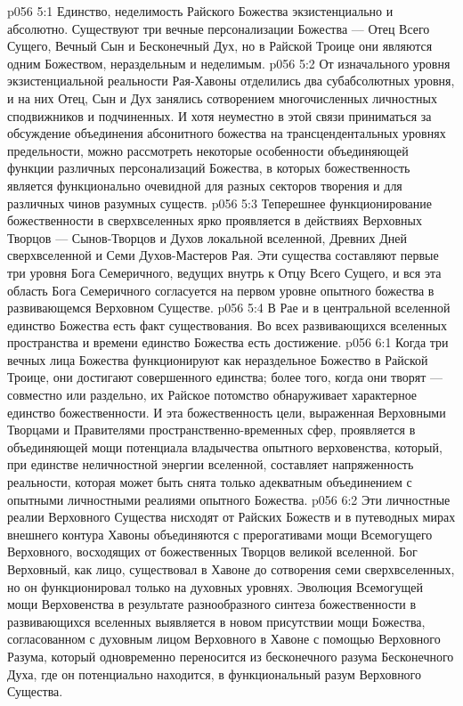 \vs p056 5:1 Единство, неделимость Райского Божества экзистенциально и абсолютно. Существуют три вечные персонализации Божества --- Отец Всего Сущего, Вечный Сын и Бесконечный Дух, но в Райской Троице они  являются одним Божеством, нераздельным и неделимым.
\vs p056 5:2 \pc От изначального уровня экзистенциальной реальности Рая\hyp{}Хавоны отделились два субабсолютных уровня, и на них Отец, Сын и Дух занялись сотворением многочисленных личностных сподвижников и подчиненных. И хотя неуместно в этой связи приниматься за обсуждение объединения абсонитного божества на трансцендентальных уровнях предельности, можно рассмотреть некоторые особенности объединяющей функции различных персонализаций Божества, в которых божественность является функционально очевидной для разных секторов творения и для различных чинов разумных существ.
\vs p056 5:3 Теперешнее функционирование божественности в сверхвселенных ярко проявляется в действиях Верховных Творцов --- Сынов\hyp{}Творцов и Духов локальной вселенной, Древних Дней сверхвселенной и Семи Духов\hyp{}Мастеров Рая. Эти существа составляют первые три уровня Бога Семеричного, ведущих внутрь к Отцу Всего Сущего, и вся эта область Бога Семеричного согласуется на первом уровне опытного божества в развивающемся Верховном Существе.
\vs p056 5:4 \pc В Рае и в центральной вселенной единство Божества есть факт существования. Во всех развивающихся вселенных пространства и времени единство Божества есть достижение.
\vs p056 6:1 Когда три вечных лица Божества функционируют как нераздельное Божество в Райской Троице, они достигают совершенного единства; более того, когда они творят --- совместно или раздельно, их Райское потомство обнаруживает характерное единство божественности. И эта божественность цели, выраженная Верховными Творцами и Правителями пространственно\hyp{}временных сфер, проявляется в объединяющей мощи потенциала владычества опытного верховенства, который, при единстве неличностной энергии вселенной, составляет напряженность реальности, которая может быть снята только адекватным объединением с опытными личностными реалиями опытного Божества.
\vs p056 6:2 Эти личностные реалии Верховного Существа нисходят от Райских Божеств и в путеводных мирах внешнего контура Хавоны объединяются с прерогативами мощи Всемогущего Верховного, восходящих от божественных Творцов великой вселенной. Бог Верховный, как лицо, существовал в Хавоне до сотворения семи сверхвселенных, но он функционировал только на духовных уровнях. Эволюция Всемогущей мощи Верховенства в результате разнообразного синтеза божественности в развивающихся вселенных выявляется в новом присутствии мощи Божества, согласованном с духовным лицом Верховного в Хавоне с помощью Верховного Разума, который одновременно переносится из бесконечного разума Бесконечного Духа, где он потенциально находится, в функциональный разум Верховного Существа.
